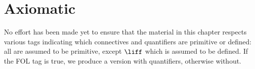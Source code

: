 \documentclass[../../../include/open-logic-chapter]{subfiles}
\begin{document}
\chapter{Axiomatic }

\begin{editorial}
  No effort has been made yet to ensure that the material in this
  chapter respects various tags indicating which connectives and
  quantifiers are primitive or defined: all are assumed to be
  primitive, except $\liff$ which is assumed to be defined. If the FOL
  tag is true, we produce a version with quantifiers, otherwise
  without.
\end{editorial}














\OLEndChapterHook
\end{document}
